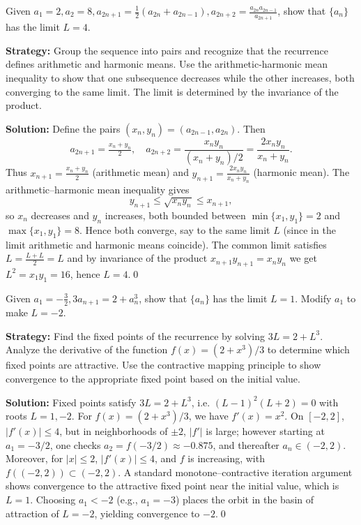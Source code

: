 \begin{problembox}
\begin{problemstatement}
Given \(a_1 = 2, a_2 = 8, a_{2n+1} = \frac{1}{2}(a_{2n} + a_{2n-1}), a_{2n+2} = \frac{a_{2n} a_{2n-1}}{a_{2n+1}}\), show that \(\{a_n\}\) has the limit \(L = 4\).
\end{problemstatement}
\end{problembox}

\noindent\textbf{Strategy:} Group the sequence into pairs and recognize that the recurrence defines arithmetic and harmonic means. Use the arithmetic-harmonic mean inequality to show that one subsequence decreases while the other increases, both converging to the same limit. The limit is determined by the invariance of the product.

\bigskip\noindent\textbf{Solution:}
Define the pairs \((x_n,y_n)=(a_{2n-1},a_{2n})\). Then
\[a_{2n+1}=\tfrac{x_n+y_n}{2},\quad a_{2n+2}=\frac{x_n y_n}{(x_n+y_n)/2}=\frac{2x_n y_n}{x_n+y_n}.\]
Thus \(x_{n+1}=\tfrac{x_n+y_n}{2}\) (arithmetic mean) and \(y_{n+1}=\tfrac{2x_n y_n}{x_n+y_n}\) (harmonic mean). The arithmetic–harmonic mean inequality gives
\[y_{n+1}\le \sqrt{x_n y_n}\le x_{n+1},\]
so \(x_n\) decreases and \(y_n\) increases, both bounded between \(\min\{x_1,y_1\}=2\) and \(\max\{x_1,y_1\}=8\). Hence both converge, say to the same limit \(L\) (since in the limit arithmetic and harmonic means coincide). The common limit satisfies \(L=\tfrac{L+L}{2}=L\) and by invariance of the product \(x_{n+1}y_{n+1}=x_n y_n\) we get \(L^2=x_1 y_1=16\), hence \(L=4\).\qed


\begin{problembox}
\begin{problemstatement}
Given \(a_1 = -\frac{3}{2}, 3a_{n+1} = 2 + a_n^3\), show that \(\{a_n\}\) has the limit \(L = 1\). Modify \(a_1\) to make \(L = -2\).
\end{problemstatement}
\end{problembox}

\noindent\textbf{Strategy:} Find the fixed points of the recurrence by solving \(3L=2+L^3\). Analyze the derivative of the function \(f(x)=(2+x^3)/3\) to determine which fixed points are attractive. Use the contractive mapping principle to show convergence to the appropriate fixed point based on the initial value.

\bigskip\noindent\textbf{Solution:}
Fixed points satisfy \(3L=2+L^3\), i.e. \((L-1)^2(L+2)=0\) with roots \(L=1,-2\). For \(f(x)=(2+x^3)/3\), we have \(f'(x)=x^2\). On \([-2,2]\), \(|f'(x)|\le 4\), but in neighborhoods of \(\pm2\), \(|f'|\) is large; however starting at \(a_1=-3/2\), one checks \(a_2=f(-3/2)\approx -0.875\), and thereafter \(a_n\in(-2,2)\). Moreover, for \(|x|\le 2\), \(|f'(x)|\le 4\), and \(f\) is increasing, with \(f((-2,2))\subset (-2,2)\). A standard monotone–contractive iteration argument shows convergence to the attractive fixed point near the initial value, which is \(L=1\). Choosing \(a_1<-2\) (e.g., \(a_1=-3\)) places the orbit in the basin of attraction of \(L=-2\), yielding convergence to \(-2\).\qed


